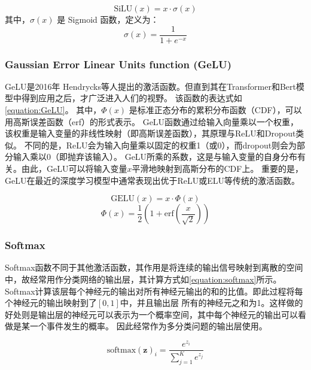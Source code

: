     \begin{equation}
      \label{equation:SiLU}
      \text{SiLU}(x) = x \cdot \sigma(x)
    \end{equation}
  其中，$\sigma(x)$ 是 Sigmoid 函数，定义为：
  \begin{equation}
    \sigma(x) = \frac{1}{1 + e^{-x}}
  \end{equation}
  
  \subsubsection{Gaussian Error Linear Units function (GeLU)}
  
  GeLU是2016年 Hendrycks等人提出的激活函数\cite{2016GeLU}。但直到其在Transformer和Bert模型中得到应用之后，才广泛进入人们的视野。
  该函数的表达式如\cref{equation:GeLU}。
  其中，$\Phi(x)$ 是标准正态分布的累积分布函数（CDF），可以用高斯误差函数（erf）的形式表示。
  GeLU函数通过给输入向量乘以一个权重，该权重是输入变量的非线性映射（即高斯误差函数），其原理与ReLU和Dropout类似。
  不同的是，ReLU会为输入向量乘以固定的权重1（或0），而dropout则会为部分输入乘以0（即抛弃该输入）。
  GeLU所乘的系数，这是与输入变量的自身分布有关。由此，GeLU可以将输入变量$x$平滑地映射到高斯分布的CDF上。
  重要的是，GeLU在最近的深度学习模型中通常表现出优于ReLU或ELU等传统的激活函数。

  \begin{equation}
    \label{equation:GeLU}
    \text{GELU}(x) = x \cdot \Phi(x) 
  \end{equation}
   \begin{equation}
    \label{equation:Gauss}
    \Phi(x) = \frac{1}{2} \left(1 + \text{erf} \left(\frac{x}{\sqrt{2}}\right)\right)
  \end{equation}
  

  \subsubsection{Softmax}

  Softmax函数不同于其他激活函数，其作用是将连续的输出信号映射到离散的空间中，故经常用作分类网络的输出层，其计算方式如\cref{equation:softmax}所示。
  Softmax计算该层每个神经元的输出对所有神经元输出的和的比值。即此过程将每个神经元的输出映射到了$[0,1]$中，并且输出层
  所有的神经元之和为1。这样做的好处则是输出层的神经元可以表示为一个概率空间，其中每个神经元的输出可以看做是某一个事件发生的概率。
  因此经常作为多分类问题的输出层使用。

\begin{equation}
  \label{equation:softmax}
  \text{softmax}(\mathbf{z})_i = \frac{e^{z_i}}{\sum_{j=1}^{K} e^{z_j}}
\end{equation}

